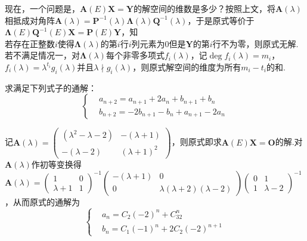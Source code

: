 \documentclass[10pt]{article}
\numberwithin{equation}{section}
\begin{document}
\par 现在，一个问题是，$\bm{A}(E)\bm{X} = \bm{Y}$的解空间的维数是多少？按照上文，将$\bm{A}(\lambda)$相抵成对角阵$\bm{A}(\lambda) = \bm{P}^{-1}(\lambda)\bm{\Lambda}(\lambda)\bm{Q}^{-1}(\lambda)$，于是原式等价于$\bm{\Lambda}(E)\bm{Q}^{-1}(E)\bm{X} = \bm{P}(E)\bm{Y}$，知\\
 若存在正整数$i$使得$\bm{\Lambda}(\lambda)$的第$i$行$i$列元素为$0$但是$\bm{Y}$的第$i$行不为零，则原式无解. \\
 若不满足情况一，对$\bm{\Lambda}(\lambda)$每个非零多项式$f_{i}(\lambda)$，记$\deg f_i(\lambda) = m_i$，$f_i(\lambda) = \lambda^{t_i}g_i(\lambda)$并且$\lambda \nmid g_i(\lambda)$，则原式解空间的维度为所有$m_i-t_i$的和.
\begin{LT}
    求满足下列式子的通解：
    \[
        \left\{
            \begin{aligned}
                &a_{n+2} = a_{n+1}+2a_n+b_{n+1}+b_n \\
                &b_{n+2} = -2b_{n+1}-b_n+a_{n+1}-2a_n
            \end{aligned}
        \right.
    \]
\end{LT}
\begin{JT}
    记$\bm{A}(\lambda) = \begin{pmatrix}(\lambda^2-\lambda-2) & -(\lambda+1) \\-(\lambda -2) & (\lambda+1)^2 \end{pmatrix}$，则原式即求$\bm{A}(E)\bm{X} = \bm{O}$的解.对$\bm{A}(\lambda)$作初等变换得\\$\bm{A}(\lambda) = 
    \begin{pmatrix}
        1 & 0 \\
        \lambda+1 & 1
    \end{pmatrix}^{-1}
    \begin{pmatrix}
        -(\lambda+1) & 0 \\
        0 & \lambda(\lambda+2)(\lambda-2)
    \end{pmatrix}
    \begin{pmatrix}
        0 & 1 \\
        1 & \lambda-2
    \end{pmatrix}^{-1}
    $
    ，从而原式的通解为
    \[
        \left\{
            \begin{aligned}
                &a_{n} = C_2(-2)^n + C_32^n \\
                &b_{n} = C_1(-1)^n + 2C_2(-2)^{n+1}
            \end{aligned}
        \right.
    \]
\end{JT}
\end{document}
